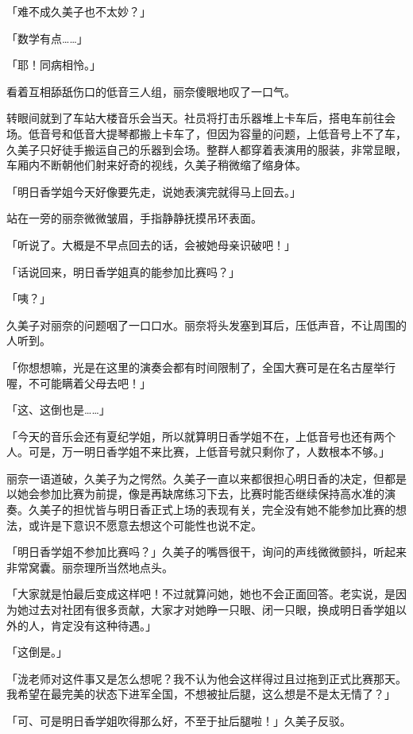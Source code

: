 \documentclass[UTF8]{ctexart}
\begin{document}
    「难不成久美子也不太妙？」 

    「数学有点……」 

    「耶！同病相怜。」 

    看着互相舔舐伤口的低音三人组，丽奈傻眼地叹了一口气。 

    转眼间就到了车站大楼音乐会当天。社员将打击乐器堆上卡车后，搭电车前往会场。低音号和低音大提琴都搬上卡车了，但因为容量的问题，上低音号上不了车，久美子只好徒手搬运自己的乐器到会场。整群人都穿着表演用的服装，非常显眼，车厢内不断朝他们射来好奇的视线，久美子稍微缩了缩身体。 

    「明日香学姐今天好像要先走，说她表演完就得马上回去。」 

    站在一旁的丽奈微微皱眉，手指静静抚摸吊环表面。 

    「听说了。大概是不早点回去的话，会被她母亲识破吧！」 

    「话说回来，明日香学姐真的能参加比赛吗？」 

    「咦？」 

    久美子对丽奈的问题咽了一口口水。丽奈将头发塞到耳后，压低声音，不让周围的人听到。 

    「你想想嘛，光是在这里的演奏会都有时间限制了，全国大赛可是在名古屋举行喔，不可能瞒着父母去吧！」 

    「这、这倒也是……」 

    「今天的音乐会还有夏纪学姐，所以就算明日香学姐不在，上低音号也还有两个人。可是，万一明日香学姐不来比赛，上低音号就只剩你了，人数根本不够。」 

    丽奈一语道破，久美子为之愕然。久美子一直以来都很担心明日香的决定，但都是以她会参加比赛为前提，像是再缺席练习下去，比赛时能否继续保持高水准的演奏。久美子的担忧皆与明日香正式上场的表现有关，完全没有她不能参加比赛的想法，或许是下意识不愿意去想这个可能性也说不定。 

    「明日香学姐不参加比赛吗？」久美子的嘴唇很干，询问的声线微微颤抖，听起来非常窝囊。丽奈理所当然地点头。 

    「大家就是怕最后变成这样吧！不过就算问她，她也不会正面回答。老实说，是因为她过去对社团有很多贡献，大家才对她睁一只眼、闭一只眼，换成明日香学姐以外的人，肯定没有这种待遇。」 

    「这倒是。」 

    「泷老师对这件事又是怎么想呢？我不认为他会这样得过且过拖到正式比赛那天。我希望在最完美的状态下进军全国，不想被扯后腿，这么想是不是太无情了？」 

    「可、可是明日香学姐吹得那么好，不至于扯后腿啦！」久美子反驳。 
\end{document}
